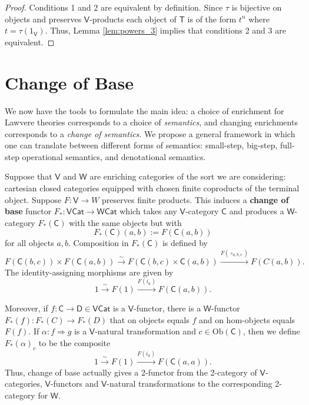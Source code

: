 \documentclass{amsart}
\theoremstyle{definition}
\newcommand{\Cat}{\mathsf{Cat}}
\newcommand{\V}{\mathsf{V}}
\newcommand{\W}{\mathsf{W}}
\newcommand{\D}{\mathsf{D}}
\newcommand{\C}{\mathsf{C}}
\newcommand{\T}{\mathsf{T}}
\newcommand{\Obj}{\mathrm{Ob}}
\newcommand{\maps}{\colon}
\begin{document}
\begin{proof}
Conditions 1 and 2 are equivalent by definition.   Since $\tau$ is bijective on 
objects and preserves $\V$-products each object of $\T$ is of the form $t^n$ 
where $t = \tau(1_\V)$.   Thus, Lemma \ref{lem:powers_3} implies that
conditions 2 and 3 are equivalent.
\end{proof}

\section{Change of Base}
\label{sec:base_change}

We now have the tools to formulate the main idea: a choice of enrichment for Lawvere theories corresponds to a choice of \textit{semantics}, and changing enrichments corresponds to a \textit{change of semantics}. We propose a general framework in which one can translate between different forms of semantics: small-step, big-step, full-step operational semantics, and denotational semantics.

Suppose that $\V$ and $\W$ are enriching categories of the sort we are considering: 
cartesian closed categories equipped with chosen finite coproducts of the terminal object.
Suppose $F \maps \V \to W$ preserves finite products.   This induces a \textbf{change of base} functor $F_*\maps\V\Cat \to \W\Cat$ \cite{borceux} which takes any $\V$-category $\C$ and produces a $\W$-category $F_*(\C)$ with the same objects but with
\[      F_*(\C)(a,b) := F(\C(a,b)) \]
for all objects $a,b$.   Composition in $F_*(\C)$ is defined by
\[       F(\C(b,c)) \times F(\C(a,b)) \stackrel{\sim}{\longrightarrow} F(\C(b,c) \times \C(a,b)) 
\xrightarrow{F(\circ_{a,b,c})} F(C(a,b)) . \]  
The identity-assigning morphisms are given by
\[          1 \stackrel{\sim}{\longrightarrow} F(1) \xrightarrow{F(i_a)}
F(\C(a,b)) .\]

Moreover, if $f\maps \C \to \D \in \V\Cat$ is a $\V$-functor, there is a $\W$-functor $F_*(f) \maps F_*(C) \to F_*(D)$ that on objects equals $f$ and on hom-objects equals $F(f)$. If $\alpha\maps f \Rightarrow g$ is a $\V$-natural transformation and $c\in \Obj(\C)$, then we define $F_*(\alpha)_c$ to be the composite
\[      1 \stackrel{\sim}{\longrightarrow} F(1) \xrightarrow{F(i_a)} F(\C(a,a)) .\]   
Thus, change of base actually gives a 2-functor from the 2-category of $\V$-categories, 
$\V$-functors and $\V$-natural transformations to the corresponding 2-category for $\W$.
\end{document}
